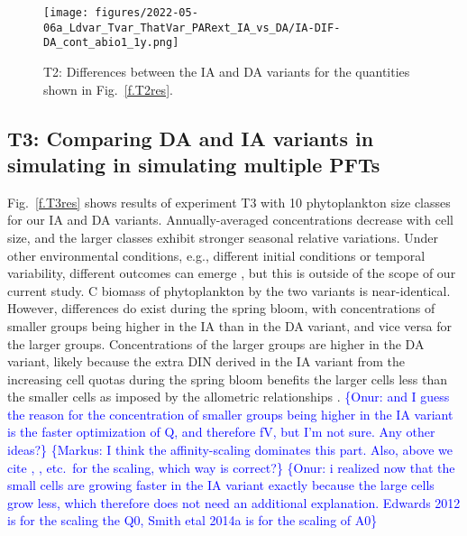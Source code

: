 \documentclass[gmd, manuscript]{copernicus}
\newcommand{\onur}[1]{\textcolor{blue}{\{Onur: #1\}}}
\newcommand{\markus}[1]{\textcolor{blue}{\{Markus: #1\}}}
\begin{document}
\begin{figure}[htb!]
\texttt{[image: figures/2022-05-06a\_Ldvar\_Tvar\_ThatVar\_PARext\_IA\_vs\_DA/IA-DIF-DA\_cont\_abio1\_1y.png]}
\caption{T2: Differences between the IA and DA variants for the quantities shown in Fig.~\ref{f.T2res}.\label{f.T2resdif}}
\end{figure}



\FloatBarrier%
\subsection{T3: Comparing DA and IA variants in simulating in simulating multiple PFTs}\label{s.resT3}

Fig.~\ref{f.T3res} shows results of experiment T3 with 10 phytoplankton size classes for our IA and DA variants. Annually-averaged concentrations decrease with cell size, and the larger classes exhibit stronger seasonal relative variations. Under other environmental conditions, e.g., different initial conditions or temporal variability, different outcomes can emerge \citep[see, e.g.,][]{Taherzadeh2017}, but this is outside of the scope of our current study.  C biomass of phytoplankton by the two variants is near-identical.  However, differences do exist during the spring bloom, with concentrations of smaller groups being higher in the IA than in the DA variant, and vice versa for the larger groups. Concentrations of the larger groups are higher in the DA variant, likely because the extra DIN derived in the IA variant from the increasing cell quotas during the spring bloom benefits the larger cells less than the smaller cells as imposed by the allometric relationships \citep[as in][]{Grover1991a,Litchman2009}. \onur{and I guess the reason for the concentration of smaller groups being higher in the IA variant is the faster optimization of Q, and therefore fV, but I'm not sure. Any other ideas?} \markus{I think the affinity-scaling dominates this part.  Also, above we cite \citet{Edwards2012}, \citet{Smith2014a}, etc.\ for the scaling, which way is correct?} \onur{i realized now that the small cells are growing faster in the IA variant exactly because the large cells grow less, which therefore does not need an additional explanation. Edwards 2012 is for the scaling the Q0, Smith etal 2014a is for the scaling of A0}
\end{document}
